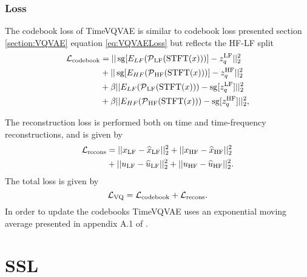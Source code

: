 \documentclass[../../thesis.tex]{subfiles}
\begin{document}
\subsubsection{Loss}
The codebook loss of TimeVQVAE is similar to codebook loss presented section \ref{section:VQVAE} equation \ref{eq:VQVAELoss} but reflects the HF-LF split
\begin{equation}
    \label{eq:TimeVQVAE_codebook}
    \begin{aligned}
        \mathcal{L}_\text{codebook} &= ||\operatorname{sg}[E_{LF}(\operatorname{\mathcal{P}}_{\mathrm{LF}}(\operatorname{\mathrm{STFT}}(x)))] - z_q^{\mathrm{LF}} ||_2^2 \\
                              &+ ||\operatorname{sg}[E_{HF}(\operatorname{\mathcal{P}}_{\mathrm{HF}}(\operatorname{\mathrm{STFT}}(x)))] - z_q^{\mathrm{HF}} ||_2^2 \\
                              &+ \beta||E_{LF}(\operatorname{\mathcal{P}}_{\mathrm{LF}}(\operatorname{\mathrm{STFT}}(x))) - \operatorname{sg}[z_q^{\mathrm{LF}}]||_2^2 \\
                              &+ \beta||E_{HF}(\operatorname{\mathcal{P}}_{\mathrm{HF}}(\operatorname{\mathrm{STFT}}(x))) - \operatorname{sg}[z_q^{\mathrm{HF}}]||_2^2,
    \end{aligned}
\end{equation}

The reconstruction loss is performed both on time and time-frequency reconstructions, and is given by
\begin{equation}
    \label{eq:TimeVQVAE_recons}
    \begin{aligned}
        \mathcal{L}_\text{recons} &= ||x_{\mathrm{LF}} - \widehat{x}_{\mathrm{LF}} ||_2^2 + ||x_{\mathrm{HF}} - \widehat{x}_{\mathrm{HF}} ||_2^2\\
                              &+ ||u_{\mathrm{LF}} - \widehat{u}_{\mathrm{LF}} ||_2^2 + ||u_{\mathrm{HF}} - \widehat{u}_{\mathrm{HF}} ||_2^2.
    \end{aligned}
\end{equation}
The total loss is given by 
\begin{equation}
    \label{eq:TimeVQVAE_loss}
    \mathcal{L}_\text{VQ} = \mathcal{L}_\text{codebook} + \mathcal{L}_\text{recons}.
\end{equation}
In order to update the codebooks TimeVQVAE uses an exponential moving average presented in appendix A.1 of \cite{VQVAE}.





\section{SSL}
\end{document}

